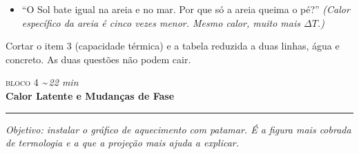 \documentclass[11pt,a4paper]{article}
\newcommand{\bloco}[3]{%
  \needspace{7\baselineskip}
  \vspace{1.8em}
  {\scshape\color{vinho}bloco #1}\hfill
    {\small\itshape\color{grafite}\textasciitilde\,#3 min}\\[0.1em]
  {\Large\bfseries #2}\\[-0.55em]
  {\color{black!30}\rule{\linewidth}{0.5pt}}
  \par\nobreak\smallskip
}
\newcommand{\objetivo}[1]{{\itshape\color{grafite}Objetivo: #1}\par\smallskip}
\begin{document}
\begin{perguntas}
\begin{itemize}[nosep]
  \item ``O Sol bate igual na areia e no mar. Por que s\'o a areia queima
        o p\'e?'' \textit{(Calor espec\'ifico da areia \'e cinco vezes menor.
        Mesmo calor, muito mais $\Delta T$.)}
\end{itemize}
\end{perguntas}

\begin{corte}
Cortar o item 3 (capacidade t\'ermica) e a tabela reduzida a duas linhas,
\'agua e concreto. As duas quest\~oes n\~ao podem cair.
\end{corte}

\bloco{4}{Calor Latente e Mudan\c{c}as de Fase}{22}

\objetivo{instalar o gr\'afico de aquecimento com patamar. \'E a figura mais
cobrada de termologia e a que a proje\c{c}\~ao mais ajuda a explicar.}
\end{document}
